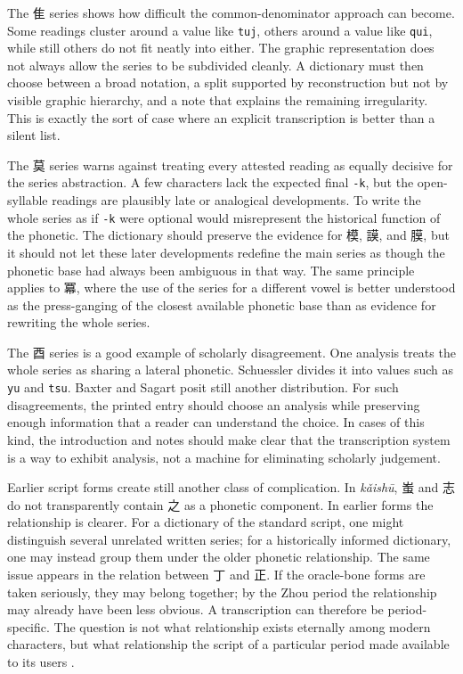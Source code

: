 The 隹 series shows how difficult the common-denominator approach can become. Some readings cluster around a value like \texttt{tuj}, others around a value like \texttt{qui}, while still others do not fit neatly into either. The graphic representation does not always allow the series to be subdivided cleanly. A dictionary must then choose between a broad notation, a split supported by reconstruction but not by visible graphic hierarchy, and a note that explains the remaining irregularity. This is exactly the sort of case where an explicit transcription is better than a silent list.

The 莫 series warns against treating every attested reading as equally decisive for the series abstraction. A few characters lack the expected final \texttt{-k}, but the open-syllable readings are plausibly late or analogical developments. To write the whole series as if \texttt{-k} were optional would misrepresent the historical function of the phonetic. The dictionary should preserve the evidence for 模, 謨, and 膜, but it should not let these later developments redefine the main series as though the phonetic base had always been ambiguous in that way. The same principle applies to 冪, where the use of the series for a different vowel is better understood as the press-ganging of the closest available phonetic base than as evidence for rewriting the whole series.

The 酉 series is a good example of scholarly disagreement. One analysis treats the whole series as sharing a lateral phonetic. Schuessler divides it into values such as \texttt{yu} and \texttt{tsu}. Baxter and Sagart posit still another distribution. For such disagreements, the printed entry should choose an analysis while preserving enough information that a reader can understand the choice. In cases of this kind, the introduction and notes should make clear that the transcription system is a way to exhibit analysis, not a machine for eliminating scholarly judgement.

Earlier script forms create still another class of complication. In \emph{kǎishū}, 蚩 and 志 do not transparently contain 之 as a phonetic component. In earlier forms the relationship is clearer. For a dictionary of the standard script, one might distinguish several unrelated written series; for a historically informed dictionary, one may instead group them under the older phonetic relationship. The same issue appears in the relation between 丁 and 正. If the oracle-bone forms are taken seriously, they may belong together; by the Zhou period the relationship may already have been less obvious. A transcription can therefore be period-specific. The question is not what relationship exists eternally among modern characters, but what relationship the script of a particular period made available to its users \parencite{shaughnessy-1991}.

